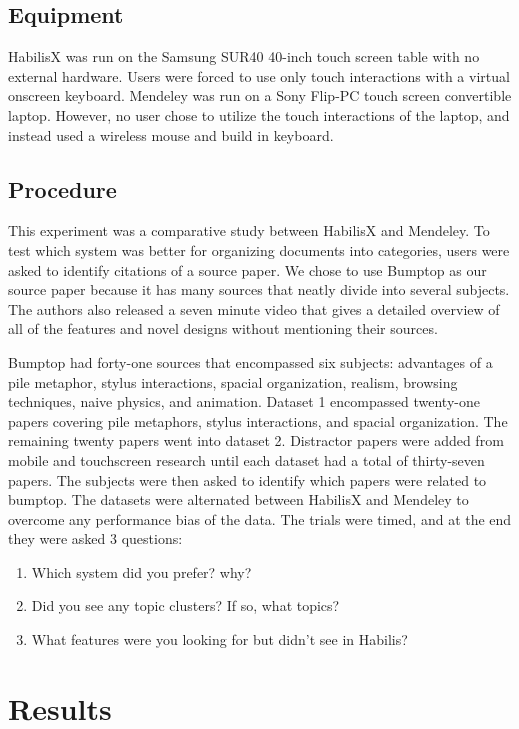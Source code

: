 \documentclass{article}
\begin{document}
\subsection*{Equipment}
	HabilisX was run on the Samsung SUR40 40-inch touch screen table with no external hardware.  Users were forced to use only touch interactions with a virtual onscreen keyboard. Mendeley was run on a Sony Flip-PC touch screen convertible laptop.  However, no user chose to utilize the touch interactions of the laptop, and instead used a wireless mouse and build in keyboard.  
	
\subsection*{Procedure}

	This experiment was a comparative study between HabilisX and Mendeley.  To test which system was better for organizing documents into categories, users were asked to identify citations of a source paper.  We chose to use Bumptop \cite{Agarawala2006}
	as our source paper because it has many sources that neatly divide into several subjects.  The authors also released a seven minute video that gives a detailed overview of all of the features and novel designs without mentioning their sources.   
	
	Bumptop had forty-one sources that encompassed six subjects: advantages of a pile metaphor, stylus interactions, spacial organization, realism, browsing techniques, naive physics, and animation.  Dataset 1 encompassed twenty-one papers covering pile metaphors, stylus interactions, and spacial organization.  The remaining twenty papers went into dataset 2.  Distractor papers were added from mobile and touchscreen research until each dataset had a total of thirty-seven papers.  The subjects were then asked to identify which papers were related to bumptop.  The datasets were alternated between HabilisX and Mendeley to overcome any performance bias of the data.  The trials were timed, and at the end they were asked 3 questions:
	\begin{enumerate}
	\item Which system did you prefer? why?
	\item Did you see any topic clusters?  If so, what topics?
	\item What features were you looking for but didn't see in Habilis?
	\end{enumerate}
\section{Results}
\end{document}
